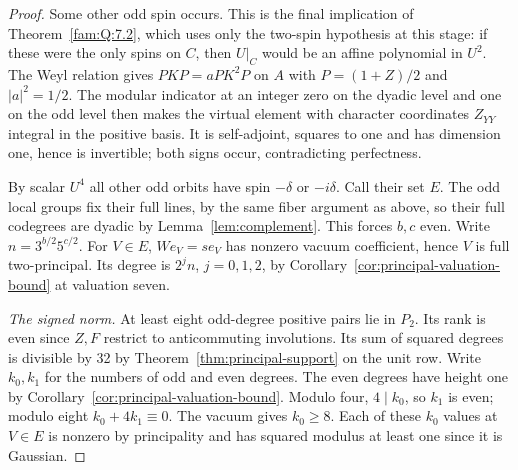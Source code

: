 \documentclass[11pt,a4paper]{article}
\numberwithin{equation}{section}
\theoremstyle{remark}
\begin{document}
\begin{proof}
Some other odd spin occurs. This is the final implication of
Theorem~\ref{fam:Q:7.2}, which uses only the two-spin hypothesis at this
stage: if these were the only spins on $C$, then $U|_C$ would be
an affine polynomial in $U^2$. The Weyl relation gives $PKP=aPK^2P$
on $A$ with $P=(1+Z)/2$ and $|a|^2=1/2$. The modular indicator at
an integer zero on the dyadic level and one on the odd level then
makes the virtual element with character coordinates $Z_{YY}$
integral in the positive basis. It is self-adjoint, squares to one
and has dimension one, hence is invertible; both signs occur,
contradicting perfectness.

By scalar $U^4$ all other odd orbits have spin $-\delta$ or
$-i\delta$. Call their set $E$. The odd local groups fix their
full lines, by the same fiber argument as above, so their full
codegrees are dyadic by Lemma~\ref{lem:complement}. This forces $b,c$ even.
Write $n=3^{b/2}5^{c/2}$. For $V\in E$, $We_V=se_V$ has nonzero
vacuum coefficient, hence $V$ is full two-principal. Its degree is
$2^j n$, $j=0,1,2$, by Corollary~\ref{cor:principal-valuation-bound} at valuation seven.

\smallskip\noindent\emph{The signed norm.}
At least eight odd-degree positive pairs lie in $P_2$. Its rank is
even since $Z,F$ restrict to anticommuting involutions. Its sum of
squared degrees is divisible by 32 by Theorem~\ref{thm:principal-support} on the unit
row. Write $k_0,k_1$ for the numbers of odd and even degrees. The
even degrees have height one by Corollary~\ref{cor:principal-valuation-bound}. Modulo four,
$4\mid k_0$, so $k_1$ is even; modulo eight $k_0+4k_1\equiv0$.
The vacuum gives $k_0\ge8$. Each of these $k_0$ values at $V\in E$
is nonzero by principality and has squared modulus at least one
since it is Gaussian.


\end{proof}
\end{document}
